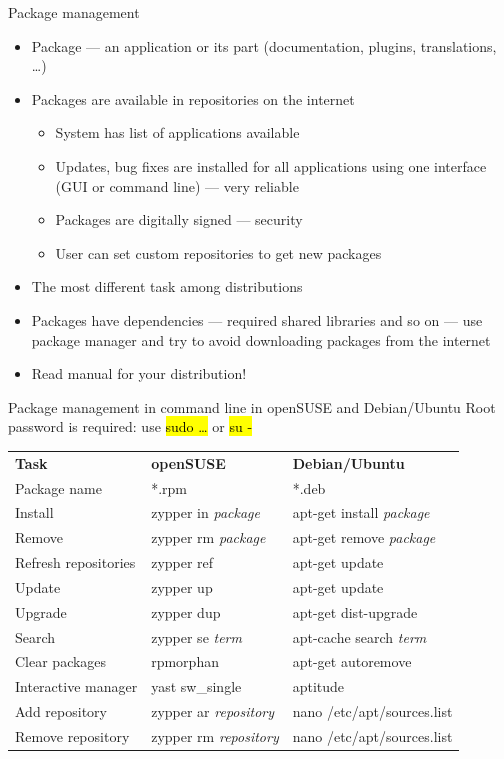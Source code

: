 \documentclass[compress, ucs, xelatex, 11pt, xcolor=svgnames,
  hyperref={
    bookmarks=true,
    unicode=true,
    colorlinks=true,
    pdftitle={Linux, command line and MetaCentrum},
    plainpages=false,
    pdfauthor={Vojtech Zeisek},
    pdfsubject={Course about use of Linux command line, writing shell scripts and using MetaCentrum of CESNET},
    pdfcreator={XeLaTeX, http://www.xelatex.org/},
    pdfkeywords={Linux, GNU, BASH, shell, command line, MetaCentrum},
    linkcolor=Sienna,
    anchorcolor=black,
    citecolor=green,
    filecolor=magenta,
    menucolor=Sienna,
    urlcolor=cyan,
    pdftex},
  url={hyphens, lowtilde} %
  ]{beamer}
\renewcommand{\texttt}[1]{\hl{\ttfamily #1}}
\begin{document}
\begin{frame}{Package management}
\begin{itemize}
  \item Package --- an application or its part (documentation, plugins, translations, \ldots)
  \item Packages are available in repositories on the internet
  \begin{itemize}
    \item System has list of applications available
    \item Updates, bug fixes are installed for all applications using one interface (GUI or command line) --- very reliable
    \item Packages are digitally signed --- security
    \item User can set custom repositories to get new packages
  \end{itemize}
  \item The most different task among distributions
  \item Packages have dependencies --- required shared libraries and so on --- use package manager and try to avoid downloading packages from the internet
  \item \alert{Read manual for your distribution!}
\end{itemize}
\end{frame}

\begin{frame}{Package management in command line in openSUSE and Debian/Ubuntu}
Root password is required: use \texttt{sudo \ldots} or \texttt{su -}
\begin{center}
\begin{tabular}{lll}
\textbf{Task} & \textbf{openSUSE} & \textbf{Debian/Ubuntu}\\
Package name & *.rpm & *.deb\\
Install & zypper in \textit{package} & apt-get install \textit{package}\\
Remove & zypper rm \textit{package} & apt-get remove \textit{package}\\
Refresh repositories & zypper ref & apt-get update\\
Update & zypper up & apt-get update\\
Upgrade & zypper dup & apt-get dist-upgrade\\
Search & zypper se \textit{term} & apt-cache search \textit{term}\\
Clear packages & rpmorphan & apt-get autoremove\\
Interactive manager & yast sw\_single & aptitude\\
Add repository & zypper ar \textit{repository} & nano /etc/apt/sources.list\\
Remove repository & zypper rm \textit{repository} & nano /etc/apt/sources.list
\end{tabular}
\end{center}
\end{frame}
\end{document}
